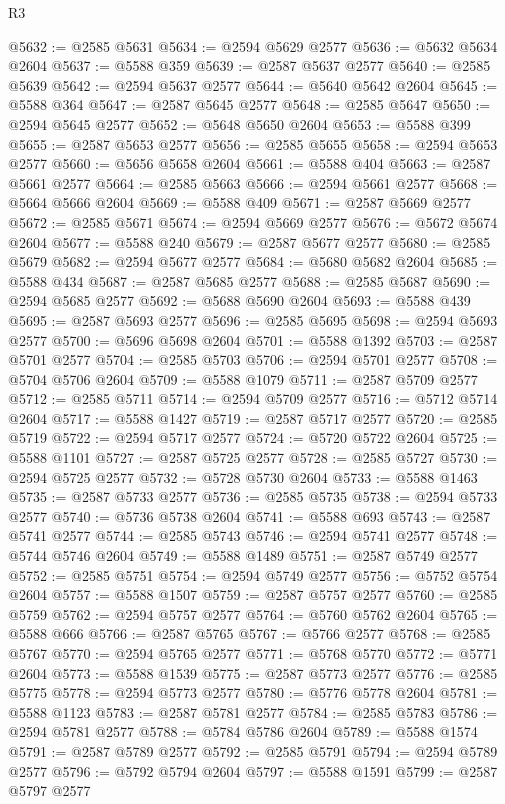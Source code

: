 \begin{lexlean}{R3}
\begin{coremodule}
@5632 := @2585 @5631
@5634 := @2594 @5629 @2577
@5636 := @5632 @5634 @2604
@5637 := @5588 @359
@5639 := @2587 @5637 @2577
@5640 := @2585 @5639
@5642 := @2594 @5637 @2577
@5644 := @5640 @5642 @2604
@5645 := @5588 @364
@5647 := @2587 @5645 @2577
@5648 := @2585 @5647
@5650 := @2594 @5645 @2577
@5652 := @5648 @5650 @2604
@5653 := @5588 @399
@5655 := @2587 @5653 @2577
@5656 := @2585 @5655
@5658 := @2594 @5653 @2577
@5660 := @5656 @5658 @2604
@5661 := @5588 @404
@5663 := @2587 @5661 @2577
@5664 := @2585 @5663
@5666 := @2594 @5661 @2577
@5668 := @5664 @5666 @2604
@5669 := @5588 @409
@5671 := @2587 @5669 @2577
@5672 := @2585 @5671
@5674 := @2594 @5669 @2577
@5676 := @5672 @5674 @2604
@5677 := @5588 @240
@5679 := @2587 @5677 @2577
@5680 := @2585 @5679
@5682 := @2594 @5677 @2577
@5684 := @5680 @5682 @2604
@5685 := @5588 @434
@5687 := @2587 @5685 @2577
@5688 := @2585 @5687
@5690 := @2594 @5685 @2577
@5692 := @5688 @5690 @2604
@5693 := @5588 @439
@5695 := @2587 @5693 @2577
@5696 := @2585 @5695
@5698 := @2594 @5693 @2577
@5700 := @5696 @5698 @2604
@5701 := @5588 @1392
@5703 := @2587 @5701 @2577
@5704 := @2585 @5703
@5706 := @2594 @5701 @2577
@5708 := @5704 @5706 @2604
@5709 := @5588 @1079
@5711 := @2587 @5709 @2577
@5712 := @2585 @5711
@5714 := @2594 @5709 @2577
@5716 := @5712 @5714 @2604
@5717 := @5588 @1427
@5719 := @2587 @5717 @2577
@5720 := @2585 @5719
@5722 := @2594 @5717 @2577
@5724 := @5720 @5722 @2604
@5725 := @5588 @1101
@5727 := @2587 @5725 @2577
@5728 := @2585 @5727
@5730 := @2594 @5725 @2577
@5732 := @5728 @5730 @2604
@5733 := @5588 @1463
@5735 := @2587 @5733 @2577
@5736 := @2585 @5735
@5738 := @2594 @5733 @2577
@5740 := @5736 @5738 @2604
@5741 := @5588 @693
@5743 := @2587 @5741 @2577
@5744 := @2585 @5743
@5746 := @2594 @5741 @2577
@5748 := @5744 @5746 @2604
@5749 := @5588 @1489
@5751 := @2587 @5749 @2577
@5752 := @2585 @5751
@5754 := @2594 @5749 @2577
@5756 := @5752 @5754 @2604
@5757 := @5588 @1507
@5759 := @2587 @5757 @2577
@5760 := @2585 @5759
@5762 := @2594 @5757 @2577
@5764 := @5760 @5762 @2604
@5765 := @5588 @666
@5766 := @2587 @5765
@5767 := @5766 @2577
@5768 := @2585 @5767
@5770 := @2594 @5765 @2577
@5771 := @5768 @5770
@5772 := @5771 @2604
@5773 := @5588 @1539
@5775 := @2587 @5773 @2577
@5776 := @2585 @5775
@5778 := @2594 @5773 @2577
@5780 := @5776 @5778 @2604
@5781 := @5588 @1123
@5783 := @2587 @5781 @2577
@5784 := @2585 @5783
@5786 := @2594 @5781 @2577
@5788 := @5784 @5786 @2604
@5789 := @5588 @1574
@5791 := @2587 @5789 @2577
@5792 := @2585 @5791
@5794 := @2594 @5789 @2577
@5796 := @5792 @5794 @2604
@5797 := @5588 @1591
@5799 := @2587 @5797 @2577

\end{coremodule}
\end{lexlean}
